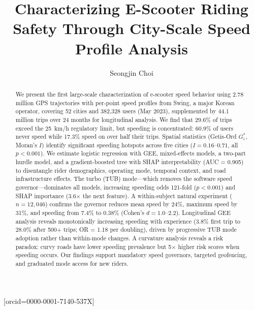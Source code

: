 \documentclass[a4paper,fleqn]{cas-sc}
\begin{document}
\let\WriteBookmarks\relax
\def\floatpagepagefraction{1}
\def\textpagefraction{.001}

\title[mode=title]{Characterizing E-Scooter Riding Safety Through City-Scale Speed Profile Analysis}

\author[1]{Seongjin Choi}[orcid=0000-0001-7140-537X]
\cormark[1]

\address[1]{Department of Civil, Environmental, and Geo- Engineering, University of Minnesota, 500 Pillsbury Dr.\ SE, Minneapolis, MN 55455, USA}


\begin{abstract}
We present the first large-scale characterization of e-scooter speed behavior using 2.78 million GPS trajectories with per-point speed profiles from Swing, a major Korean operator, covering 52 cities and 382,328 users (May 2023), supplemented by 44.1 million trips over 24 months for longitudinal analysis. We find that 29.6\% of trips exceed the 25~km/h regulatory limit, but speeding is concentrated: 60.9\% of users never speed while 17.3\% speed on over half their trips. Spatial statistics (Getis-Ord $G_i^*$, Moran's $I$) identify significant speeding hotspots across five cities ($I = 0.16$--$0.71$, all $p < 0.001$). We estimate logistic regression with GEE, mixed-effects models, a two-part hurdle model, and a gradient-boosted tree with SHAP interpretability (AUC = 0.905) to disentangle rider demographics, operating mode, temporal context, and road infrastructure effects. The turbo (TUB) mode---which removes the software speed governor---dominates all models, increasing speeding odds 121-fold ($p < 0.001$) and SHAP importance (3.6$\times$ the next feature). A within-subject natural experiment ($n = 12{,}046$) confirms the governor reduces mean speed by 24\%, maximum speed by 31\%, and speeding from 7.4\% to 0.38\% (Cohen's $d = 1.0$--$2.2$). Longitudinal GEE analysis reveals monotonically increasing speeding with experience (3.8\% first trip to 28.0\% after 500+ trips; OR = 1.18 per doubling), driven by progressive TUB mode adoption rather than within-mode changes. A curvature analysis reveals a risk paradox: curvy roads have lower speeding prevalence but 5$\times$ higher risk scores when speeding occurs. Our findings support mandatory speed governors, targeted geofencing, and graduated mode access for new riders.
\end{abstract}
\end{document}
